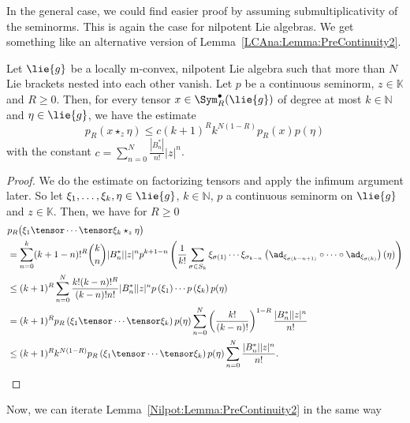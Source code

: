 In the general case, we could find easier proof by assuming submultiplicativity of 
the seminorms. This is again the case for nilpotent Lie algebras. We get something 
like an alternative version of Lemma~\ref{LCAna:Lemma:PreContinuity2}.
\begin{lemma}
	\label{Nilpot:Lemma:PreContinuity2}
	Let $\lie{g}$ be a locally m-convex, nilpotent Lie algebra such that more than 
	$N$ Lie brackets nested into each other vanish. Let $p$ be a continuous 
	seminorm, $z \in \mathbb{K}$ and $R \geq 0$. Then, for every tensor 
	$x \in \Sym_R^{\bullet}(\lie{g})$ of degree at most $k \in \mathbb{N}$ and 
	$\eta \in \lie{g}$, we have the estimate
	\begin{equation}
		\label{Nilpot:PreContinuity}
		p_R \left( x \star_z \eta \right)
		\leq
		c (k + 1)^R k^{N (1-R)}
		p_R (x) p(\eta)
	\end{equation}
	with the constant $c = \sum_{n = 0}^N \frac{|B_n^*|}{n!} |z|^n$.
\end{lemma}
\begin{proof}
	We do the estimate on factorizing tensors and apply the infimum 
	argument later. So let $\xi_1, \ldots, \xi_k, \eta \in \lie{g}$, $k \in 
	\mathbb{N}$, $p$ a continuous seminorm on $\lie{g}$ and $z \in \mathbb{K}$. 
	Then, we have for $R \geq 0$
	\begin{align*}
		&
		p_R 
		\big(
			\xi_1 \tensor \cdots \tensor \xi_k \star_z \eta
		\big)
		\\
		& =
		\sum\limits_{n = 0}^k
		(k + 1 - n)!^R \binom{k}{n}
		|B_n^*| |z|^n
		p^{k + 1 - n} \left(
			\frac{1}{k!}
			\sum\limits_{\sigma \in S_k}
			\xi_{\sigma(1)} \cdots \xi_{\sigma_{k-n}}
			\left( 
				\ad_{\xi_{\sigma(k-n+1)}} 
				\circ \cdots \circ 
				\ad_{\xi_{\sigma(k)}} 
			\right) (\eta)
		\right)
		\\
		& \leq
		(k + 1)^R
		\sum\limits_{n = 0}^N
		\frac{ k! (k-n)!^R }{ (k-n)! n! }
		|B_n^*| |z|^n
		p\left( \xi_1 \right) \cdots p\left( \xi_k \right) 
		p(\eta)
		\\
		& =
		(k + 1)^R
		p_R \left(
			\xi_1 \tensor \cdots \tensor \xi_k
		\right)
		p(\eta)
		\sum\limits_{n = 0}^N
		\left( \frac{k!}{(k-n)!} \right)^{1-R}
		\frac{|B_n^*| |z|^n}{n!}
		\\
		& \leq
		(k + 1)^R
		k^{N (1-R)}
		p_R \left(
			\xi_1 \tensor \cdots \tensor \xi_k
		\right)
		p(\eta)
		\sum\limits_{n = 0}^N
		\frac{|B_n^*| |z|^n}{n!}.
	\end{align*}
\end{proof}
Now, we can iterate Lemma~\ref{Nilpot:Lemma:PreContinuity2} in the same way 
